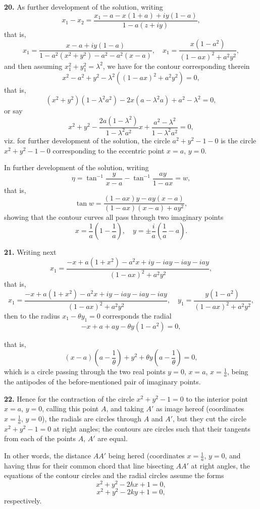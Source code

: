 \documentclass[11pt,a4paper]{book}
\begin{document}
\textbf{20.} As further development of the solution, writing
\[
x_1 - x_2 = \frac{x_1 - a - x(1 + a) + i y(1 - a)}{1 - a(z + iy)},
\]
that is,
\[
x_1 = \frac{x - a + iy(1 - a)}{1 - a^2(x^2 + y^2) - a^2 - a^2(x - a)}, \quad x_1 = \frac{x(1 - a^2)}{(1 - ax)^2 + a^2 y^2},
\]
and then assuming $x_1^2 + y_1^2 = \lambda^2$, we have for the contour corresponding therein
\[
x^2 - a^2 + y^2 - \lambda^2((1 - a x)^2 + a^2 y^2) = 0,
\]
that is,
\[
(x^2 + y^2) (1 - \lambda^2 a^2) - 2x(a - \lambda^2 a) + a^2 - \lambda^2 = 0,
\]
or say
\[
x^2 + y^2 - \frac{2a(1 - \lambda^2)}{1 - \lambda^2 a^2} x + \frac{a^2 - \lambda^2}{1 - \lambda^2 a^2} = 0,
\]
viz. for further development of the solution, the circle $a^2 + y^2 - 1 - 0$ is the circle $x^2 + y^2 - 1 - 0$ corresponding to the eccentric point $x = a$, $y = 0$.

In further development of the solution, writing
\[
\eta = \tan^{-1}\frac{y}{x - a} - \tan^{-1} \frac{ay}{1 - ax} = w,
\]
that is,
\[
\tan w = \frac{(1 - a x) y - a y (x - a)}{(1 - ax)(x - a) + a y^2},
\]
showing that the contour curves all pass through two imaginary points
\[
x = \frac{1}{a}\left(1 - \frac{1}{a}\right), \quad y = \pm\frac{i}{a}\left(\frac{1}{a} - a\right).
\]

\textbf{21.} Writing next
\[
x_1 = \frac{- x + a(1 + x^2) - a^2 x + i y - i a y - i a y - i a y}{(1 - ax)^2 + a^2 y^2},
\]
that is,
\[
x_1 = \frac{- x + a(1 + x^2) - a^2 x + i y - i a y - i a y - i a y}{(1 - ax)^2 + a^2 y^2}, \quad y_1 = \frac{y(1 - a^2)}{(1 - ax)^2 + a^2 y^2},
\]
then to the radius $x_1 - \theta y_1 = 0$ corresponds the radial
\[
- x + a + a y - \theta y (1 - a^2) = 0,
\]

that is,
\[
(x - a)\left(a - \frac{1}{\theta}\right) + y^2 + \theta y\left(a - \frac{1}{\theta}\right) = 0,
\]
which is a circle passing through the two real points $y = 0$, $x = a$, $x = \frac{1}{a}$, being the antipodes of the before-mentioned pair of imaginary points.

\textbf{22.} Hence for the contraction of the circle $x^2 + y^2 - 1 = 0$ to the interior point $x = a$, $y = 0$, calling this point $A$, and taking $A'$ as image hereof (coordinates $x = \frac{1}{a}$, $y = 0$), the radials are circles through $A$ and $A'$, but they cut the circle $x^2 + y^2 - 1 = 0$ at right angles; the contours are circles such that their tangents from each of the points $A$, $A'$ are equal.

In other words, the distance $AA'$ being hered (coordinates $x = \frac{1}{a}$, $y = 0$, and having thus for their common chord that line bisecting $AA'$ at right angles, the equations of the contour circles and the radial circles assume the forms
\[
x^2 + y^2 - 2hx + 1 = 0,
\]
\[
x^2 + y^2 - 2ky + 1 = 0,
\]
respectively.
\end{document}
